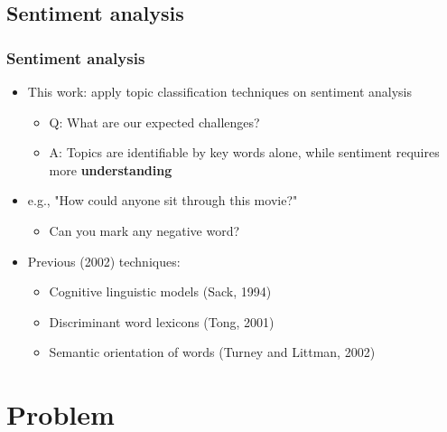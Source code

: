 \documentclass{beamer}
\begin{document}
\subsection{Sentiment analysis}

\begin{frame}
	\frametitle{Sentiment analysis}
	\begin{itemize}
	\item This work: apply topic classification techniques on sentiment analysis
	\begin{itemize}
		\item Q: What are our expected challenges?
		\pause
		\item A: Topics are identifiable by key words alone, while sentiment requires more \textbf{understanding}
	\end{itemize}
	\end{itemize}
	\pause
	\begin{itemize}
		\item e.g., "How could anyone sit through this movie?"
		\begin{itemize}
			\item Can you mark  any negative word?
		\end{itemize}
	
	\end{itemize}
	\pause
	
	\begin{itemize}
	\item Previous (2002) techniques:
	\begin{itemize}
		\item Cognitive linguistic models (Sack, 1994)
		\item Discriminant word lexicons (Tong, 2001)
		\item Semantic orientation of words (Turney and Littman, 2002)
	\end{itemize}
	\end{itemize}
	

\end{frame}

\section{Problem}
\end{document}
